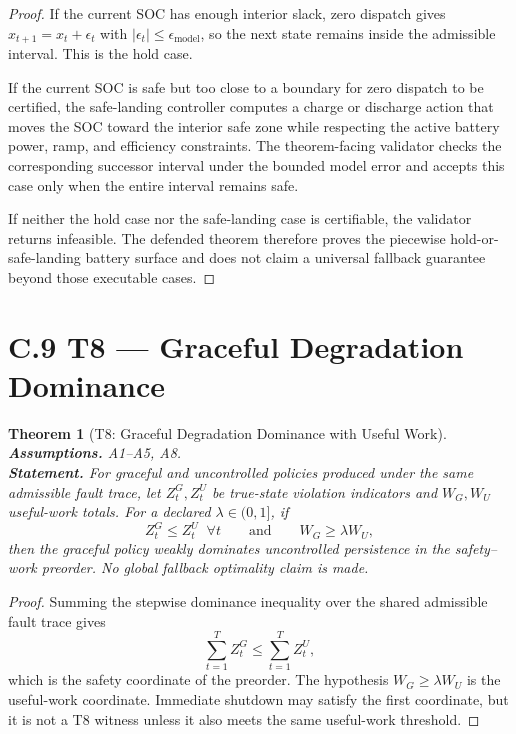 \documentclass[11pt]{article}
\newtheorem{theorem}{Theorem}
\newcommand{\1}{\mathbf{1}}
\begin{document}
\begin{proof}
If the current SOC has enough interior slack, zero dispatch gives
$x_{t+1}=x_t+\epsilon_t$ with $|\epsilon_t|\le\epsilon_{\mathrm{model}}$, so
the next state remains inside the admissible interval.  This is the hold case.

If the current SOC is safe but too close to a boundary for zero dispatch to be
certified, the safe-landing controller computes a charge or discharge action
that moves the SOC toward the interior safe zone while respecting the active
battery power, ramp, and efficiency constraints.  The theorem-facing validator
checks the corresponding successor interval under the bounded model error and
accepts this case only when the entire interval remains safe.

If neither the hold case nor the safe-landing case is certifiable, the
validator returns infeasible.  The defended theorem therefore proves the
piecewise hold-or-safe-landing battery surface and does not claim a universal
fallback guarantee beyond those executable cases. \qedhere
\end{proof}

\section*{C.9 T8 --- Graceful Degradation Dominance}

\begin{theorem}[T8: Graceful Degradation Dominance with Useful Work]
\textbf{Assumptions.} A1--A5, A8. \\
\textbf{Statement.} For graceful and uncontrolled policies produced under the
same admissible fault trace, let \(Z_t^G,Z_t^U\) be true-state violation
indicators and \(W_G,W_U\) useful-work totals.  For a declared
\(\lambda\in(0,1]\), if
\[
  Z_t^G \le Z_t^U \;\; \forall t
  \qquad\text{and}\qquad
  W_G\ge\lambda W_U,
\]
then the graceful policy weakly dominates uncontrolled persistence in the
safety--work preorder.  No global fallback optimality claim is made.
\end{theorem}

\begin{proof}
Summing the stepwise dominance inequality over the shared admissible fault trace
gives
\[
  \sum_{t=1}^{T} Z_t^G
  \le
  \sum_{t=1}^{T} Z_t^U,
\]
which is the safety coordinate of the preorder.  The hypothesis
\(W_G\ge\lambda W_U\) is the useful-work coordinate.  Immediate shutdown may
satisfy the first coordinate, but it is not a T8 witness unless it also meets
the same useful-work threshold. \qedhere
\end{proof}
\end{document}
